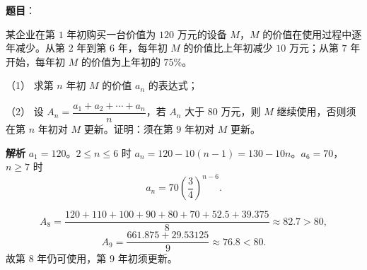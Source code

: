 \begin{answer}

\textbf{题目}：

某企业在第 $1$ 年初购买一台价值为 $120$ 万元的设备 $M$，$M$ 的价值在使用过程中逐年减少。从第 $2$ 年到第 $6$ 年，每年初 $M$ 的价值比上年初减少 $10$ 万元；从第 $7$ 年开始，每年初 $M$ 的价值为上年初的 $75\%$。

（1） 求第 $n$ 年初 $M$ 的价值 $a_n$ 的表达式；

（2） 设 $A_n=\dfrac{a_1+a_2+\cdots+a_n}{n}$，若 $A_n$ 大于 $80$ 万元，则 $M$ 继续使用，否则须在第 $n$ 年初对 $M$ 更新。证明：须在第 $9$ 年初对 $M$ 更新。

\textbf{解析}
$a_1=120$。$2\leqslant n\leqslant6$ 时 $a_n=120-10(n-1)=130-10n$。$a_6=70$，$n\geqslant7$ 时
\nopagebreak[4]
\[a_n=70\left(\frac34\right)^{n-6}.\]

\nopagebreak[4]
\[A_8=\frac{120+110+100+90+80+70+52.5+39.375}8\approx82.7>80,\]
\nopagebreak[4]
\[A_9=\frac{661.875+29.53125}9\approx76.8<80.\]
故第 $8$ 年仍可使用，第 $9$ 年初须更新。



\end{answer}
